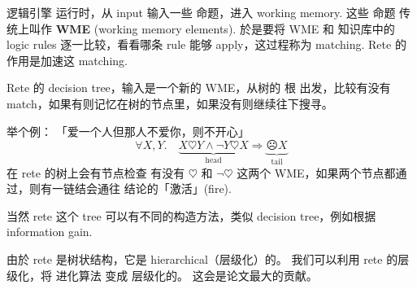逻辑引擎 运行时，从 input 输入一些 命题，进入 working memory.  这些 命题 传统上叫作 \textbf{WME} (working memory elements).  於是要将 WME 和 知识库中的 logic rules 逐一比较，看看哪条 rule 能够 apply，这过程称为 matching.  Rete 的作用是加速这 matching.

Rete 的 decision tree，输入是一个新的 WME，从树的 根 出发，比较有没有 match，如果有则记忆在树的节点里，如果没有则继续往下搜寻。

举个例： 「爱一个人但那人不爱你，则不开心」
\begin{equation}
\forall X, Y.  \quad \underbrace{X \heartsuit Y \wedge \neg Y \heartsuit X}_{\mbox{head}} \Rightarrow \underbrace{\frownie X}_{\mbox{tail}}
\end{equation}
在 rete 的树上会有节点检查 有没有 $\heartsuit$ 和 $\neg \heartsuit$ 这两个 WME，如果两个节点都通过，则有一链结会通往 结论的「激活」(fire). 

当然 rete 这个 tree 可以有不同的构造方法，类似 decision tree，例如根据 information gain. 

由於 rete 是树状结构，它是 hierarchical（层级化）的。 我们可以利用 rete 的层级化，将 进化算法 变成 层级化的。 这会是论文最大的贡献。

